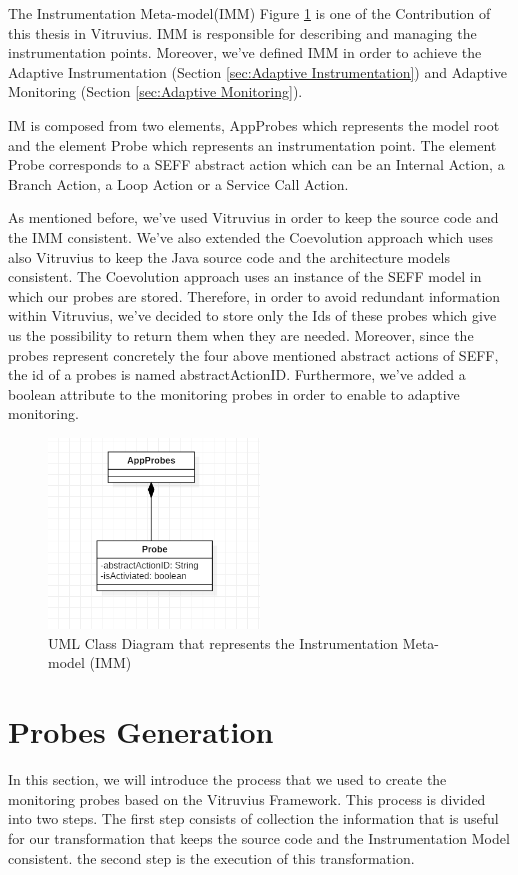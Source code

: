 The Instrumentation Meta-model(IMM) Figure \ref{fig:im} is one of the Contribution of this thesis in Vitruvius. IMM is responsible for describing and managing the instrumentation points. Moreover, we've defined IMM in order to achieve the Adaptive Instrumentation (Section \ref{sec:Adaptive Instrumentation}) and Adaptive Monitoring (Section \ref{sec:Adaptive Monitoring}).

IM is composed from two elements, AppProbes which represents the model root and the element Probe which represents an instrumentation point. The element Probe corresponds to a SEFF abstract action which can be an Internal Action, a Branch Action, a Loop Action or a Service Call Action.

As mentioned before, we’ve used Vitruvius in order to keep the source code and the IMM consistent. We've also extended the Coevolution approach which uses also Vitruvius to keep the Java source code and the architecture models consistent. The Coevolution approach uses an instance of the SEFF model in which our probes are stored. Therefore, in order to avoid redundant information within Vitruvius, we've decided to store only the Ids of these probes which give us the possibility to return them when they are needed. Moreover, since the probes represent concretely the four above mentioned abstract actions of SEFF, the id of a probes is named abstractActionID. Furthermore, we've added a boolean attribute to the monitoring probes in order to enable to adaptive monitoring. 

\begin{figure}[h]
\centering
\includegraphics[width=0.5\textwidth]{figures/im}
\caption{UML Class Diagram that represents the Instrumentation Meta-model (IMM)}
\label{fig:im}
\end{figure}

\section{Probes Generation}
\label{sec:Monitoring probes generation}
In this section, we will introduce the process that we used to create the monitoring probes based on the Vitruvius Framework. This process is divided into two steps. The first step consists of collection the information that is useful for our transformation that keeps the source code and the Instrumentation Model consistent. the second step is the execution of this transformation.

